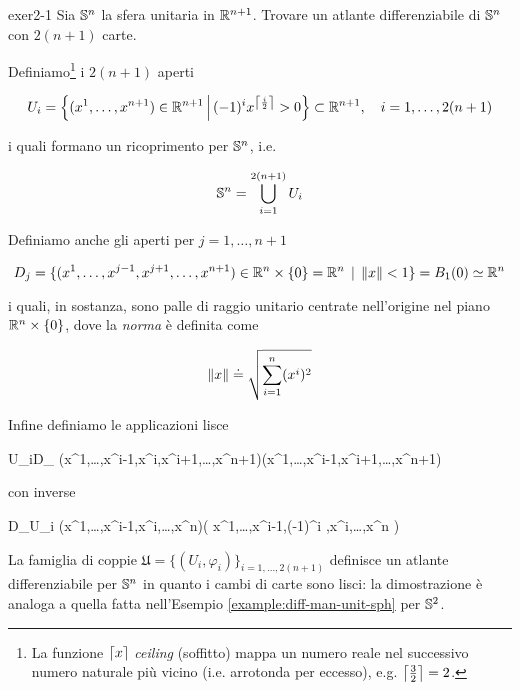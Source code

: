 {exer2-1}
{
Sia $ \S^{n} $ la sfera unitaria in $ \R^{n+1} $. Trovare un atlante differenziabile di $ \S^{n} $ con $ 2(n+1) $ carte.
}
{
Definiamo\footnote{%
	La funzione $ \ceil*{x} $ \textit{ceiling} (soffitto) mappa un numero reale nel successivo numero naturale più vicino (i.e. arrotonda per eccesso), e.g. $ \ceil*{\frac{3}{2}} = 2 $.%
} i $ 2(n+1) $ aperti

\begin{equation}
	U_{i} = \left\{ (x^{1},\dots,x^{n+1}) \in \R^{n+1} \st (-1)^{i} x^{\ceil*{\frac{i}{2}}} > 0 \right\} \subset \R^{n+1} %
	\qcomma i = 1, \dots, 2(n+1)
\end{equation}

i quali formano un ricoprimento per $ \S^{n} $, i.e.

\begin{equation}
	\S^{n} = \bigcup_{i=1}^{2(n+1)} U_{i}
\end{equation}

Definiamo anche gli aperti per $ j = 1,\dots,n+1 $

\begin{equation}
	D_{j} = \{ (x^{1},\dots,x^{j-1},x^{j+1},\dots,x^{n+1}) \in \R^{n} \times \{0\} = \R^{n} \, \mid \, \norm{x} < 1 \} = B_{1}(0) \simeq \R^{n}
\end{equation}

i quali, in sostanza, sono palle di raggio unitario centrate nell'origine nel piano $ \R^{n} \times \{0\} $, dove la \textit{norma} è definita come

\begin{equation}
	\norm{x} \doteq \sqrt{ \sum_{i=1}^{n} (x^{i})^{2} }
\end{equation}

Infine definiamo le applicazioni lisce

	{U_{i}}{D_{}}
	{(x^{1},\dots,x^{i-1},x^{i},x^{i+1},\dots,x^{n+1})}{(x^{1},\dots,x^{i-1},x^{i+1},\dots,x^{n+1})}

con inverse

	{D_{}}{U_{i}}
	{(x^{1},\dots,x^{i-1},x^{i},\dots,x^{n})}{\left( x^{1},\dots,x^{i-1},(-1)^{i} ,x^{i},\dots,x^{n} \right)}

La famiglia di coppie $ \mathfrak{U} = \{ (U_{i},\varphi_{i}) \}_{i=1,\dots,2(n+1)} $ definisce un atlante differenziabile per $ \S^{n} $ in quanto i cambi di carte sono lisci: la dimostrazione è analoga a quella fatta nell'Esempio \ref{example:diff-man-unit-sph} per $ \S^{2} $.
}

